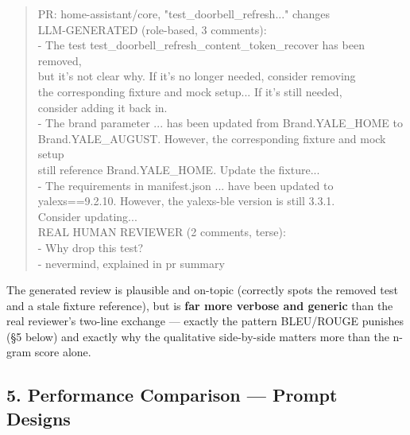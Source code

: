 \documentclass{experimentreport}
\begin{document}
{\begin{quote}
\ttfamily\footnotesize\noindent
PR: home-assistant/core, "test\_doorbell\_refresh..." changes\\[0.4em]
LLM-GENERATED (role-based, 3 comments):\\
- The test test\_doorbell\_refresh\_content\_token\_recover has been removed,\\
\hspace*{1.0em}  but it's not clear why. If it's no longer needed, consider removing\\
\hspace*{1.0em}  the corresponding fixture and mock setup... If it's still needed,\\
\hspace*{1.0em}  consider adding it back in.\\
- The brand parameter ... has been updated from Brand.YALE\_HOME to\\
\hspace*{1.0em}  Brand.YALE\_AUGUST. However, the corresponding fixture and mock setup\\
\hspace*{1.0em}  still reference Brand.YALE\_HOME. Update the fixture...\\
- The requirements in manifest.json ... have been updated to\\
\hspace*{1.0em}  yalexs==9.2.10. However, the yalexs-ble version is still 3.3.1.\\
\hspace*{1.0em}  Consider updating...\\[0.4em]
REAL HUMAN REVIEWER (2 comments, terse):\\
- Why drop this test?\\
- nevermind, explained in pr summary
\end{quote}

The generated review is plausible and on-topic (correctly spots the removed test and a stale
fixture reference), but is \textbf{far more verbose and generic} than the real reviewer's two-line
exchange --- exactly the pattern BLEU/ROUGE punishes (\S5 below) and exactly why the qualitative
side-by-side matters more than the n-gram score alone.

\subsection*{5. Performance Comparison --- Prompt Designs}

}
\end{document}
